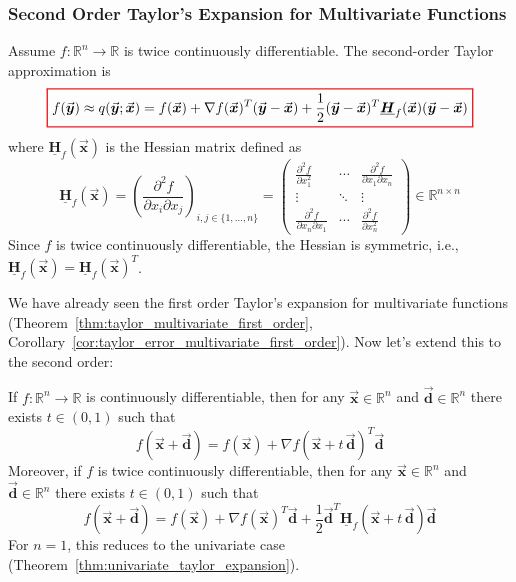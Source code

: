 \documentclass[9pt, headings=standardclasses, parskip=half]{scrartcl}
\newcommand{\matr}[1]{\underline{\boldsymbol{#1}}}
\newcommand{\vect}[1]{\vec{\boldsymbol{#1}}}
\begin{document}
\subsubsection{Second Order Taylor's Expansion for Multivariate Functions}
\label{subsubsec:second_order_taylor_multivariate}
Assume \(f:\mathbb{R}^{n}\to\mathbb{R}\) is twice continuously differentiable. The second-order Taylor approximation is
\begin{equation}
\label{eq:second_order_taylor_approximation_multivariate}
{\color{Red}
\setlength{\fboxrule}{1pt}
\boxed{ 
\color{black}
f(\vect{y})\approx q(\vect{y};\vect{x})=f(\vect{x})+\nabla f(\vect{x})^{T}(\vect{y}-\vect{x})+\frac{1}{2}(\vect{y}-\vect{x})^{T}\matr{H}_{f}(\vect{x})(\vect{y}-\vect{x}) %
}
}
\end{equation}
where \(\matr{H}_{f}(\vect{x})\) is the Hessian matrix defined as 
\begin{equation}\label{eq:hessian}
\matr{H}_{f}(\vect{x})
=
\left(\frac{\partial^{2}f}{\partial x_{i}\partial x_{j}}\right)_{i,j \in \{1,\ldots,n\}}
=
\begin{pmatrix}
\frac{\partial^{2}f}{\partial x_{1}^{2}} & \cdots & \frac{\partial^{2}f}{\partial x_{1}\partial x_{n}} \\
\vdots & \ddots & \vdots \\
\frac{\partial^{2}f}{\partial x_{n}\partial x_{1}} & \cdots & \frac{\partial^{2}f}{\partial x_{n}^{2}}
\end{pmatrix}
\in \mathbb{R}^{n \times n} %
\end{equation}
Since \(f\) is twice continuously differentiable, the Hessian is symmetric, i.e., \(\matr{H}_{f}(\vect{x})=\matr{H}_{f}(\vect{x})^{T}\).

We have already seen the first order Taylor's expansion for multivariate functions (Theorem~\ref{thm:taylor_multivariate_first_order}, Corollary~\ref{cor:taylor_error_multivariate_first_order}). 
Now let's extend this to the second order:
\begin{theorem}
  \label{thm:multivariate_taylor_expansion_second}
  If \(f:\mathbb{R}^{n}\to\mathbb{R}\) is continuously differentiable, then for any \(\vect{x}\in\mathbb{R}^{n}\) and \(\vect{d}\in\mathbb{R}^{n}\) there exists \(t\in (0,1)\) such that
  \[
  f(\vect{x}+\vect{d})=f(\vect{x})+\nabla f(\vect{x}+t\,\vect{d})^{T}\vect{d} %
  \]
  Moreover, if \(f\) is twice continuously differentiable, then for any \(\vect{x}\in\mathbb{R}^{n}\) and \(\vect{d}\in\mathbb{R}^{n}\) there exists \(t\in (0,1)\) such that
  \[
  f(\vect{x}+\vect{d})=f(\vect{x})+\nabla f(\vect{x})^{T}\vect{d}+\frac{1}{2}\vect{d}^{T}\matr{H}_{f}(\vect{x}+t\,\vect{d})\vect{d} %
  \]
  For \(n = 1\), this reduces to the univariate case (Theorem~\ref{thm:univariate_taylor_expansion}).
\end{theorem}
\end{document}
